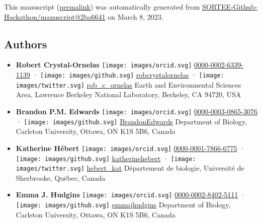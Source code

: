 This manuscript
(\href{https://SORTEE-Github-Hackathon.github.io/manuscript/v/2ba66415ee4d5e69b7890e54bec942747e76e441/}{permalink})
was automatically generated
from \href{https://github.com/SORTEE-Github-Hackathon/manuscript/tree/2ba66415ee4d5e69b7890e54bec942747e76e441}{SORTEE-Github-Hackathon/manuscript@2ba6641}
on March 8, 2023.

\hypertarget{authors}{%
\subsection{Authors}\label{authors}}

\begin{itemize}
\item
  \textbf{Robert Crystal-Ornelas}
  \texttt{[image: images/orcid.svg]}
  \href{https://orcid.org/0000-0002-6339-1139}{0000-0002-6339-1139}
  · \texttt{[image: images/github.svg]}
  \href{https://github.com/robcrystalornelas}{robcrystalornelas}
  · \texttt{[image: images/twitter.svg]}
  \href{https://twitter.com/rob_c_ornelas}{rob\_c\_ornelas}
  Earth and Environmental Sciences Area, Lawrence Berkeley National Laboratory, Berkeley, CA 94720, USA
\item
  \textbf{Brandon P.M. Edwards}
  \texttt{[image: images/orcid.svg]}
  \href{https://orcid.org/0000-0003-0865-3076}{0000-0003-0865-3076}
  · \texttt{[image: images/github.svg]}
  \href{https://github.com/BrandonEdwards}{BrandonEdwards}
  Department of Biology, Carleton University, Ottawa, ON K1S 5B6, Canada
\item
  \textbf{Katherine Hébert}
  \texttt{[image: images/orcid.svg]}
  \href{https://orcid.org/0000-0001-7866-6775}{0000-0001-7866-6775}
  · \texttt{[image: images/github.svg]}
  \href{https://github.com/katherinehebert}{katherinehebert}
  · \texttt{[image: images/twitter.svg]}
  \href{https://twitter.com/hebert_kat}{hebert\_kat}
  Département de biologie, Université de Sherbrooke, Québec, Canada
\item
  \textbf{Emma J. Hudgins}
  \texttt{[image: images/orcid.svg]}
  \href{https://orcid.org/0000-0002-8402-5111}{0000-0002-8402-5111}
  · \texttt{[image: images/github.svg]}
  \href{https://github.com/emmajhudgins}{emmajhudgins}
  Department of Biology, Carleton University, Ottawa, ON K1S 5B6, Canada

\end{itemize}
